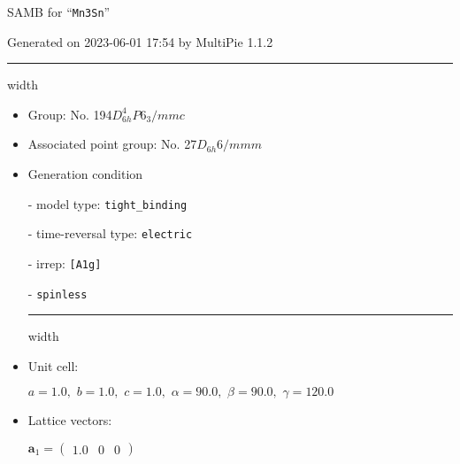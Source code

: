 \documentclass[fleqn,10pt,landscape]{article}
\begin{document}
\setcounter{MaxMatrixCols}{16}

\setlength{\baselineskip}{16pt}
\footnotesize
\begin{center}
\LARGE
SAMB for ``\texttt{Mn3Sn}''
\end{center}
\begin{flushright}
Generated on 2023-06-01 17:54 by MultiPie 1.1.2
\end{flushright}
\vspace{1cm}


 \hfil \hrule height 1mm width \textwidth \hfil

\begin{itemize}
\item Group: No. 194\quad$D_{6h}^{4}$\quad$P6_3/mmc$\quad[ hexagonal ]

\item Associated point group: No. 27\quad$D_{6h}$\quad$6/mmm$\quad[ hexagonal ]

\vspace{5mm}

\item Generation condition

\quad - model type: \texttt{tight_binding}

\quad - time-reversal type: \texttt{electric}

\quad - irrep: \texttt{[A1g]}

\quad - \texttt{spinless}


 \hfil \hrule height 1mm width \textwidth \hfil

\item Unit cell:

\quad $a=1.0,\,\, b=1.0,\,\, c=1.0,\,\, \alpha=90.0,\,\, \beta=90.0,\,\, \gamma=120.0$

\item Lattice vectors:

\quad $\bm{a}_1=\begin{pmatrix} 1.0 & 0 & 0 \end{pmatrix}$


\end{itemize}
\end{document}
